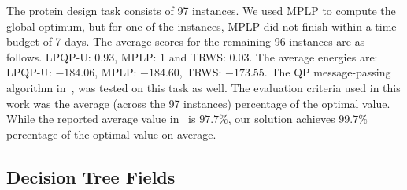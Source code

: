 The protein design task consists of 97 instances. We used \ac{MPLP} to compute the global optimum, 
but for one of the instances, \ac{MPLP} did not finish within a time-budget of 7 days. 
The average scores for the remaining 96 instances are as follows. \acs{LPQP-U}:
$0.93$, \ac{MPLP}: $1$ and \ac{TRWS}: $0.03$. The average energies are:
\acs{LPQP-U}:
$-184.06$, \ac{MPLP}: $-184.60$, \ac{TRWS}: $-173.55$.
The \ac{QP} message-passing algorithm in~\parencite{Kumar2011}, was tested on this task as well. 
The evaluation criteria used in this work was the average (across the 97 instances) percentage 
of the optimal value. While the reported average value in~\parencite{Kumar2011} is $97.7\%$, 
our solution achieves $99.7\%$ percentage of the optimal value on average. 

\subsection{Decision Tree Fields}

